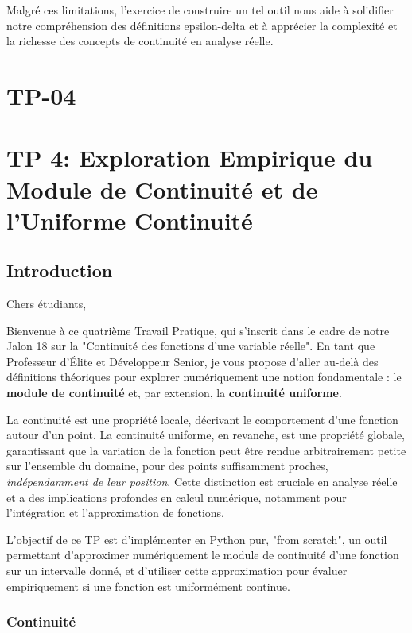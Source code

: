 \documentclass[12pt,a4paper]{report}
\begin{document}
Malgré ces limitations, l'exercice de construire un tel outil nous aide à solidifier notre compréhension des définitions epsilon-delta et à apprécier la complexité et la richesse des concepts de continuité en analyse réelle.

\section{TP-04}
\section{TP 4: Exploration Empirique du Module de Continuité et de l'Uniforme Continuité}

\subsection{Introduction}

Chers étudiants,

Bienvenue à ce quatrième Travail Pratique, qui s'inscrit dans le cadre de notre Jalon 18 sur la "Continuité des fonctions d'une variable réelle". En tant que Professeur d'Élite et Développeur Senior, je vous propose d'aller au-delà des définitions théoriques pour explorer numériquement une notion fondamentale : le \textbf{module de continuité} et, par extension, la \textbf{continuité uniforme}.

La continuité est une propriété locale, décrivant le comportement d'une fonction autour d'un point. La continuité uniforme, en revanche, est une propriété globale, garantissant que la variation de la fonction peut être rendue arbitrairement petite sur l'ensemble du domaine, pour des points suffisamment proches, \textit{indépendamment de leur position}. Cette distinction est cruciale en analyse réelle et a des implications profondes en calcul numérique, notamment pour l'intégration et l'approximation de fonctions.

L'objectif de ce TP est d'implémenter en Python pur, "from scratch", un outil permettant d'approximer numériquement le module de continuité d'une fonction sur un intervalle donné, et d'utiliser cette approximation pour évaluer empiriquement si une fonction est uniformément continue.



\subsubsection{Continuité}
\end{document}
